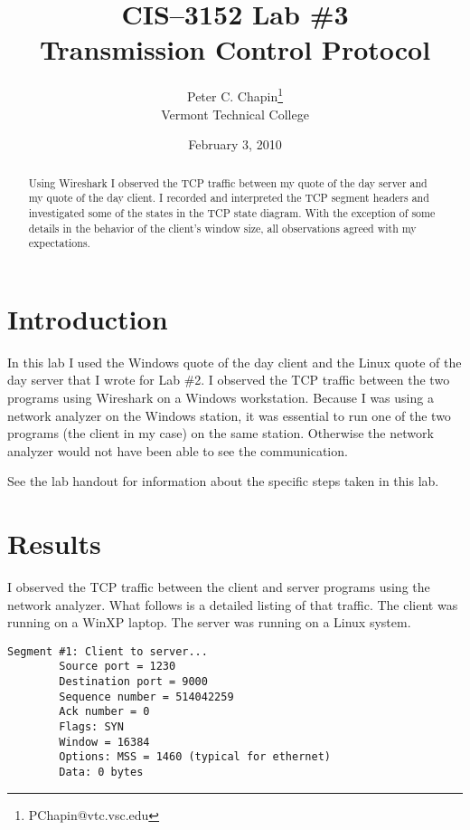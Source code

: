 \documentclass{article}
\begin{document}
\title{CIS--3152 Lab \#3\\Transmission Control Protocol}
\author{Peter C. Chapin\thanks{PChapin@vtc.vsc.edu}\\
  Vermont Technical College}
\date{February 3, 2010}
\maketitle

\begin{abstract}
  Using Wireshark I observed the TCP traffic between my quote of the day server and my quote of
  the day client. I recorded and interpreted the TCP segment headers and investigated some of
  the states in the TCP state diagram. With the exception of some details in the behavior of the
  client's window size, all observations agreed with my expectations.
\end{abstract}


\section{Introduction}
\label{sec:introduction}

In this lab I used the Windows quote of the day client and the Linux quote of the day server
that I wrote for Lab \#2. I observed the TCP traffic between the two programs using Wireshark on
a Windows workstation. Because I was using a network analyzer on the Windows station, it was
essential to run one of the two programs (the client in my case) on the same station. Otherwise
the network analyzer would not have been able to see the communication.

See the lab handout for information about the specific steps taken in this lab.

\section{Results}
\label{sec:results}

I observed the TCP traffic between the client and server programs using the network analyzer.
What follows is a detailed listing of that traffic. The client was running on a WinXP laptop.
The server was running on a Linux system.

\begin{verbatim}
Segment #1: Client to server...
        Source port = 1230
        Destination port = 9000
        Sequence number = 514042259
        Ack number = 0
        Flags: SYN
        Window = 16384
        Options: MSS = 1460 (typical for ethernet)
        Data: 0 bytes
\end{verbatim}
\end{document}
